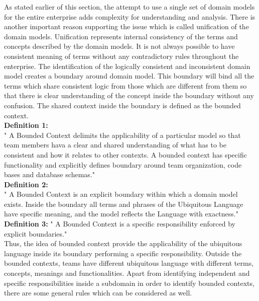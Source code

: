 As stated earlier of this section, the attempt to use a single set of domain models for the entire enterprise adds complexity for understanding and analysis. There is another important reason supporting the issue which is called unification of the domain models. Unification represents internal consistency of the terms and concepts described by the domain models. It is not always possible to have consistent meaning of terms without any contradictory rules throughout the enterprise. The identification of the logically consistent and inconsistent domain model creates a boundary around domain model. This boundary will bind all the terms which share consistent logic from those which are different from them so that there is clear understanding of the concept inside the boundary without any confusion. The shared context inside the boundary is defined as the bounded context.
\\
\textbf{Definition 1:} \label{bounded_context_definition_1}
\\
" A Bounded Context delimits the applicability of a particular model so that team members hava a clear and shared understanding of what has to be consistent and how it relates to other contexts. A bounded context has specific functionality and explicitly defines boundary around team organization, code bases and database schemas."\cite{Evans:2003aa}
\\
\textbf{Definition 2:} \label{bounded_context_definition_2}
\\
" A Bounded Context is an explicit boundary within which a domain model exists. Inside the boundary all terms and phrases of the Ubiquitous Language have specific meaning, and the model reflects the Language with exactness." \cite{Vernon:2013aa}
\\
\textbf{Definition 3:} \label{bounded_context_definition_3}
" A Bounded Context is a specific responsibility enforced by explicit boundaries." \cite{Mike:2012aa}
\\
Thus, the idea of bounded context provide the applicability of the ubiquitous language inside its boundary performing a specific responsibility. Outside the bounded contexts, teams have different ubiquitous language with different terms, concepts, meanings and functionalities. Apart from identifying independent and specific responsibilities inside a subdomain in order to identify bounded contexts, there are some general rules which can be considered as well.
